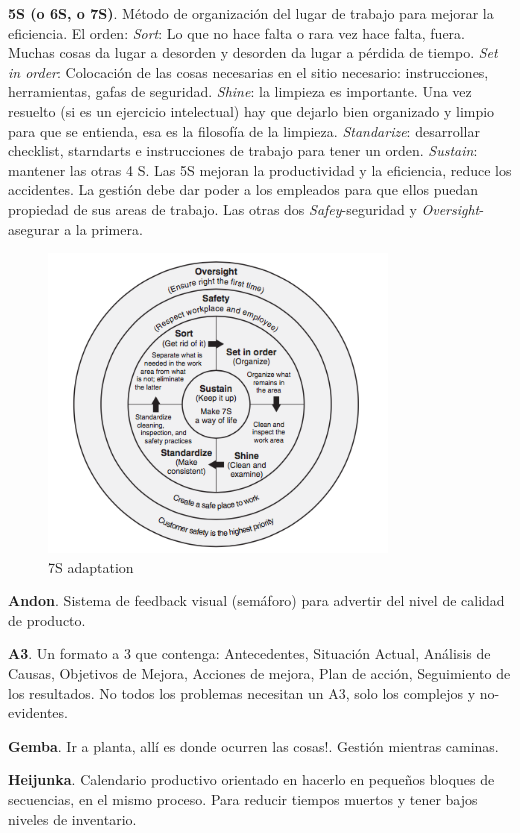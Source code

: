 \documentclass[]{article}
\begin{document}
\textbf{5S (o 6S, o 7S)}. Método de organización del lugar de trabajo para mejorar la eficiencia. El orden: \textit{Sort}: Lo que no hace falta o rara vez hace falta, fuera. Muchas cosas da lugar a desorden y desorden da lugar a pérdida de tiempo. \textit{Set in order}: Colocación de las cosas necesarias en el sitio necesario: instrucciones, herramientas, gafas de seguridad. \textit{Shine}: la limpieza es importante. Una vez resuelto (si es un ejercicio intelectual) hay que dejarlo bien organizado y limpio para que se entienda, esa es la filosofía de la limpieza. \textit{Standarize}: desarrollar checklist, starndarts e instrucciones de trabajo para tener un orden. \textit{Sustain}: mantener las otras 4 S. Las 5S mejoran la productividad y la eficiencia, reduce los accidentes. La gestión debe dar poder a los empleados para que ellos puedan propiedad de sus areas de trabajo. Las otras dos \textit{Safey}-seguridad y \textit{Oversight}-asegurar a la primera.

\begin{figure}[ht!]
	\centering
	\includegraphics[width=90mm]{imagenes/7S.png}
	\caption{7S adaptation}
	\label{fig:Las7S}
\end{figure}


\textbf{Andon}. Sistema de feedback visual (semáforo) para advertir del nivel de calidad de producto.

\textbf{A3}. Un formato a 3 que contenga: Antecedentes, Situación Actual, Análisis de Causas, Objetivos de Mejora, Acciones de mejora, Plan de acción, Seguimiento de los resultados. No todos los problemas necesitan un A3, solo los complejos y no-evidentes.

\textbf{Gemba}. Ir a planta, allí es donde ocurren las cosas!. Gestión mientras caminas.

\textbf{Heijunka}. Calendario productivo orientado en hacerlo en pequeños bloques de secuencias, en el mismo proceso. Para reducir tiempos muertos y tener bajos niveles de inventario.
\end{document}
